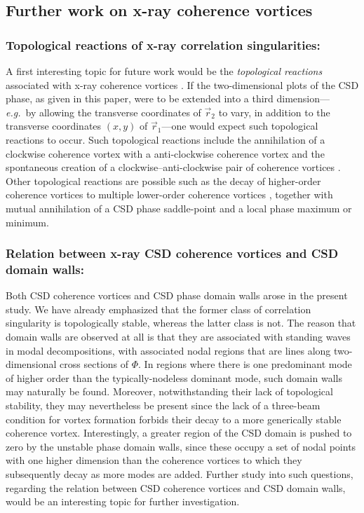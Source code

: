 \documentclass{iucr}              %
\begin{document}
\subsection{Further work on x-ray coherence vortices}\label{subsec:Discussion-part-3}

\subsubsection{Topological reactions of x-ray correlation singularities:} A first interesting topic for future work would be the {\em topological reactions} associated with x-ray coherence vortices \cite{GburSPIE,TopologicalReactionsCohVortices,Marasinghe2010}.  If the two-dimensional plots of the CSD phase, as given in this paper, were to be extended into a third dimension---{\em e.g.}~by allowing the transverse coordinates of $\vec{r}_2$ to vary, in addition to the transverse coordinates $(x,y)$ of $\vec{r}_1$---one would expect such topological reactions to occur.  Such topological reactions include the annihilation of a clockwise coherence vortex with a anti-clockwise coherence vortex and the spontaneous creation of a clockwise--anti-clockwise pair of coherence vortices \cite{TopologicalReactionsCohVortices}.  Other topological reactions are possible such as the decay of higher-order coherence vortices to multiple lower-order coherence vortices \cite{TopologicalReactionsCohVortices}, together with mutual annihilation of a CSD phase saddle-point and a local phase maximum or minimum.  

\subsubsection{Relation between x-ray CSD coherence vortices and CSD domain walls:} Both CSD coherence vortices and CSD phase domain walls arose in the present study.  We have already emphasized that the former class of correlation singularity is topologically stable, whereas the latter class is not.  The reason that domain walls are observed at all is that they are associated with standing waves in modal decompositions, with associated nodal regions that are lines along two-dimensional cross sections of $\Phi$.  In regions where there is one predominant mode of higher order than the typically-nodeless dominant mode, such domain walls may naturally be found.  Moreover, notwithstanding their lack of topological stability, they may nevertheless be present since the lack of a three-beam condition for vortex formation \cite{ThreeBeamCondition} forbids their decay to a more generically stable coherence vortex.  Interestingly, a greater region of the CSD domain is pushed to zero by the unstable phase domain walls, since these occupy a set of nodal points with one higher dimension than the coherence vortices to which they subsequently decay as more modes are added.  Further study into such questions, regarding the relation between CSD coherence vortices and CSD domain walls, would be an interesting topic for further investigation.  
\end{document}

